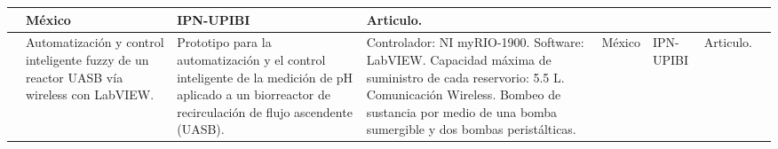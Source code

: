 \begin{sidewaystable}
\begin{tabular}{m{5mm} m{25mm} m{45mm} m{35mm} m{20mm} m{20mm} m{15mm} m{25mm}}
{     }
 & 
    \centering México & \centering IPN-UPIBI & \centering Articulo. & \quad[¬.¬] \\
    \midrule
    \centering 3 & \centering Automatización y control inteligente fuzzy de un reactor UASB vía wireless con LabVIEW. & \centering Prototipo para la automatización y el control inteligente de la medición de pH aplicado a un biorreactor de recirculación de flujo ascendente (UASB). & 
    \parbox{35mm}{Controlador: NI myRIO-1900.
Software: LabVIEW.
Capacidad máxima de suministro de cada reservorio: 5.5 L.
Comunicación Wireless.
Bombeo de sustancia por medio de una bomba sumergible y dos bombas peristálticas.} & 
    \centering México & \centering IPN-UPIBI & \centering Articulo. & \qquad[=)] \\
    \bottomrule
  \end{tabular}  
\end{sidewaystable}

